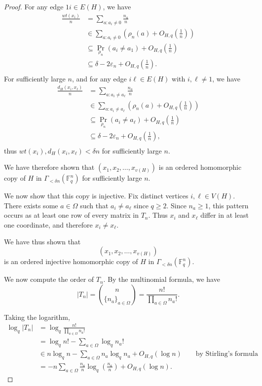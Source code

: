 \documentclass[12pt]{article}
\newcommand{\Fq}{\mathbb{F}_q}
\begin{document}
\begin{proof}
For any edge $1i\in E(H)$, we have
\begin{align*}
\frac{wt(x_i)}{n}
&=\sum_{a:a_i\neq0}\frac{n_a}{n}\\
&\in\sum_{a:a_i\neq0}\left(\rho_n(a)+O_{H,q}\left(\frac1n\right)\right)\\
&\subseteq\Pr_{\rho_n}(a_i\neq a_1)+O_{H,q}\left(\frac1n\right)\\
&\subseteq\delta-2\varepsilon_n+O_{H,q}\left(\frac1n\right).\\
\end{align*}
For sufficiently large $n$, and for any edge $i\ell\in E(H)$ with $i,\ell\neq1$, we have
\begin{align*}
\frac{d_H(x_i,x_\ell)}{n}
&=\sum_{a:a_i\neq a_\ell}\frac{n_a}{n}\\
&\in\sum_{a:a_i\neq a_\ell}\left(\rho_n(a)+O_{H,q}\left(\frac1n\right)\right)\\
&\subseteq\Pr_{\rho_n}(a_i\neq a_\ell)+O_{H,q}\left(\frac1n\right)\\
&\subseteq\delta-2\varepsilon_n+O_{H,q}\left(\frac1n\right),\\
\end{align*}
thus $wt(x_i),d_H(x_i,x_\ell)<\delta n$ for sufficiently large $n$.

We have therefore shown that $(x_1,x_2,\dots,x_{v(H)})$ is an ordered homomorphic copy of $H$ in $\Gamma_{<\delta n}(\Fq^n)$ for sufficiently large $n$.

We now show that this copy is injective. Fix distinct vertices
$i,\ell\in V(H)$. There exists some $a\in\Omega$ such that $a_i\neq a_\ell$ since $q\geq2$. Since $n_a\geq1$, this pattern occurs as at least one row of every matrix in $T_n$. Thus $x_i$ and $x_\ell$ differ in at least one coordinate, and therefore $x_i\neq x_\ell$.

We have thus shown that
\[
(x_1,x_2,\dots,x_{v(H)})
\]
is an ordered injective homomorphic copy of $H$ in $\Gamma_{<\delta n}(\Fq^n)$.

We now compute the order of $T_n$. By the multinomial formula, we have
\[
|T_n|=\binom{n}{\{n_a\}_{a\in\Omega}}=\frac{n!}{\prod_{a\in\Omega}n_a!}.
\]

Taking the logarithm,
\begin{align*}
\log_q|T_n|
&=\log_q\frac{n!}{\prod_{a\in\Omega}n_a!}\\
&=\log_qn!-\sum_{a\in\Omega}\log_qn_a!\\
&\in n\log_qn-\sum_{a\in\Omega}n_a\log_qn_a+O_{H,q}(\log n)
\qquad\text{by Stirling's formula}\\
&=-n\sum_{a\in\Omega}\frac{n_a}{n}
\log_q\left(\frac{n_a}{n}\right)+O_{H,q}(\log n).
\end{align*}


\end{proof}
\end{document}
